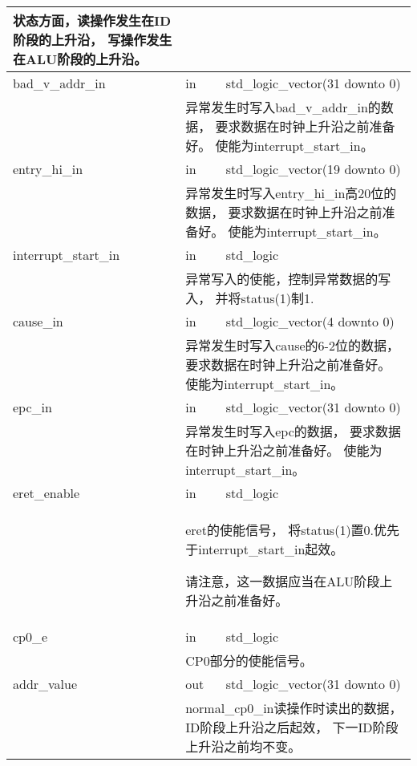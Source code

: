 \begin{tabularx}{\textwidth}{lll}
{	            状态方面，读操作发生在ID阶段的上升沿，%
                写操作发生在ALU阶段的上升沿。
            } \\
            \midrule
	        bad\_v\_addr\_in & in       & std\_logic\_vector(31 downto 0) \\
            \cmidrule(l){2-3}
            &
            \multicolumn{2}{X}{
	            异常发生时写入bad\_v\_addr\_in的数据，%
                要求数据在时钟上升沿之前准备好。%
                使能为interrupt\_start\_in。
            } \\
            \midrule
	        entry\_hi\_in   & in        & std\_logic\_vector(19 downto 0) \\
            \cmidrule(l){2-3}
            &
            \multicolumn{2}{X}{
	            异常发生时写入entry\_hi\_in高20位的数据，%
                要求数据在时钟上升沿之前准备好。%
                使能为interrupt\_start\_in。
            } \\
            \midrule
	        interrupt\_start\_in & in   & std\_logic \\
            \cmidrule(l){2-3}
            &
            \multicolumn{2}{X}{
	            异常写入的使能，控制异常数据的写入，%
                并将status(1)制1.
            } \\
            \midrule
	        cause\_in       & in        & std\_logic\_vector(4 downto 0) \\
            \cmidrule(l){2-3}
            &
            \multicolumn{2}{X}{
	            异常发生时写入cause的6-2位的数据，%
                要求数据在时钟上升沿之前准备好。%
                使能为interrupt\_start\_in。
            } \\
            \midrule
	        epc\_in         & in        & std\_logic\_vector(31 downto 0) \\
            \cmidrule(l){2-3}
            &
            \multicolumn{2}{X}{
	            异常发生时写入epc的数据，%
                要求数据在时钟上升沿之前准备好。%
                使能为interrupt\_start\_in。
            } \\
            \midrule
	        eret\_enable    & in        & std\_logic \\
            \cmidrule(l){2-3}
            &
            \multicolumn{2}{X}{
	            eret的使能信号，%
                将status(1)置0.优先于interrupt\_start\_in起效。

	            请注意，这一数据应当在ALU阶段上升沿之前准备好。
            } \\
            \midrule
	        cp0\_e          & in        & std\_logic \\
	        \cmidrule(l){2-3}
            &
            \multicolumn{2}{X}{
                CP0部分的使能信号。
            } \\
            \midrule
	        addr\_value     & out       & std\_logic\_vector(31 downto 0) \\
            \cmidrule(l){2-3}
            &
            \multicolumn{2}{X}{
	            normal\_cp0\_in读操作时读出的数据，%
                ID阶段上升沿之后起效，%
                下一ID阶段上升沿之前均不变。

}
\end{tabularx}

